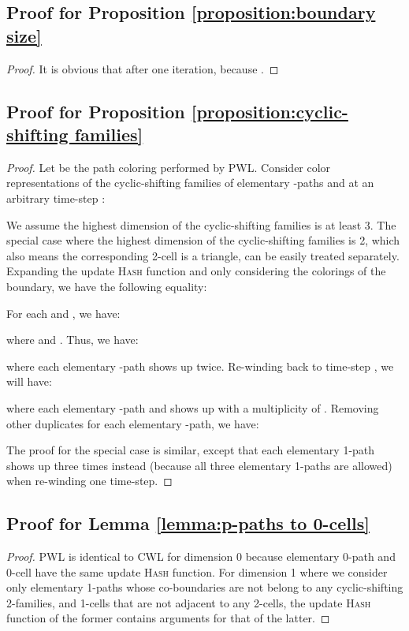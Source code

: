 \documentclass[letterpaper]{article} \usepackage{aaai24}  \usepackage{times}  \usepackage{helvet}  \usepackage{courier}  \usepackage[hyphens]{url}  \usepackage{graphicx} \urlstyle{rm} \def\UrlFont{\rm}  \usepackage{natbib}  \usepackage{caption} \frenchspacing  \setlength{\pdfpagewidth}{8.5in} \setlength{\pdfpageheight}{11in} \usepackage{algorithm}
\begin{document}
\subsection{Proof for Proposition \ref{proposition:boundary size}}


\begin{proof}
    It is obvious that after one iteration,  because .
\end{proof}


\subsection{Proof for Proposition \ref{proposition:cyclic-shifting families}}

\begin{proof}
     Let  be the path coloring performed by PWL. Consider color representations of the cyclic-shifting families of elementary -paths  and  at an arbitrary time-step :
    
We assume the highest dimension of the cyclic-shifting families is at least 3. The special case where the highest dimension of the cyclic-shifting families is 2, which also means the corresponding 2-cell is a triangle, can be easily treated separately. Expanding the update \textsc{Hash} function and only considering the colorings of the boundary, we have the following equality:

For each  and , we have:

where  and . Thus, we have:

where each elementary -path shows up twice. Re-winding back to time-step , we will have:

where each elementary -path  and  shows up with a multiplicity of . Removing other  duplicates for each elementary -path, we have:

The proof for the special case is similar, except that each elementary 1-path shows up three times instead (because all three elementary 1-paths are allowed) when re-winding one time-step.
\end{proof}
\subsection{Proof for Lemma \ref{lemma:p-paths to 0-cells}}

\begin{proof}
    PWL is identical to CWL for dimension 0 because elementary 0-path and 0-cell have the same update \textsc{Hash} function. For dimension 1 where we consider only elementary 1-paths whose co-boundaries are not belong to any cyclic-shifting 2-families, and 1-cells that are not adjacent to any 2-cells, the update \textsc{Hash} function of the former contains arguments for that of the latter.
\end{proof}
\end{document}
